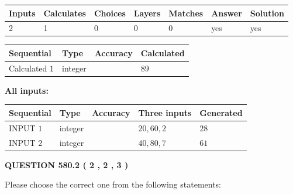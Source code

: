 \documentclass[12pt]{article}
\begin{document}
 
\noindent{}
 
 

 
   
   
   
   
\noindent\begin{tabular}{|l|l|l|l|l|l|l|}
 \hline
Inputs & Calculates & Choices & Layers & Matches & Answer & Solution \\ \hline
 2  & 
 1  & 
 0
  & 
 0  & 
 0  & 
  yes & 
  yes 
  \\ \hline
 \end{tabular}
   
   
   
   
\noindent{}
   
   
  
  
\noindent\begin{tabular}{|l|l|l|l|}
\hline
 Sequential & Type & Accuracy & Calculated \\ 
\hline
 
 
  Calculated $  1 $ & integer &  & 
  $ 89 $ 
 \\  \hline  
 \end{tabular}
   
   
   
   
\noindent\vspace{0.1in}\hspace{-0.08in} {\textbf{\Large{All inputs: }}}
   
   
  
  
\noindent\begin{tabular}{|l|l|l|l|l|}
\hline
 Sequential & Type & Accuracy & Three inputs & Generated \\ 
\hline
 
 
  INPUT $  1 $ & integer &  & $
 20
 , 
 60
 , 
 2
 $ & $ 28 $ 
 \\  \hline  
 
 
  INPUT $  2 $ & integer &  & $
 40
 , 
 80
 , 
 7
 $ & $ 61 $ 
 \\  \hline  
 \end{tabular}
   
   
  
\vspace{0.2in}
  
{\textbf{\Large{QUESTION
580.2 
 ( 2 , 2 , 3 )
}}}
  
  
Please choose the correct one from the following statements:
 
\end{document}
